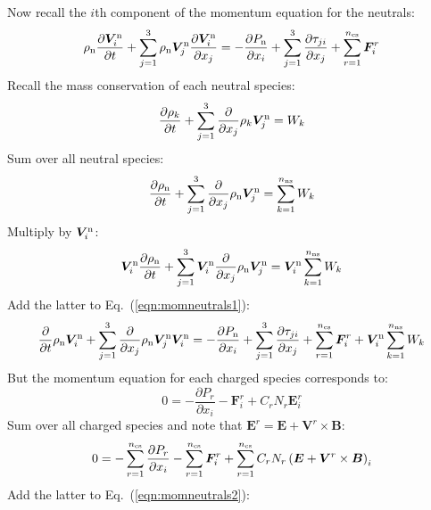 \documentclass{warpdoc}
\newcommand{\nns}{{n_{\rm ns}}}
\newcommand{\ncs}{{n_{\rm cs}}}
\renewcommand{\vec}[1]{\bm{#1}}
\begin{document}
Now recall the $i$th component of the momentum equation for the neutrals:
%
\begin{equation}
  \rho_{\rm n} \frac{\partial \vec{V}_i^{\rm n} }{\partial t}+ \sum_{j=1}^3 \rho_{\rm n} \vec{V}_j^{\rm n} \frac{\partial \vec{V}_i^{\rm n}}{\partial x_j}
=
-\frac{\partial P_{\rm n}}{\partial x_i} 
+ \sum_{j=1}^3 \frac{\partial \tau_{ji}}{\partial x_j}
+ \sum_{r=1}^\ncs \vec{F}_i^r
\label{eqn:momneutrals1}
\end{equation}
%
Recall the mass conservation of each neutral species:
%
\begin{equation}
\frac{\partial \rho_k}{\partial t} + \sum_{j=1}^3 \frac{\partial}{\partial x_j} \rho_k \vec{V}^{\rm n}_j = W_k
\end{equation}
%
Sum over all neutral species:
%
\begin{equation}
\frac{\partial \rho_{\rm n}}{\partial t} + \sum_{j=1}^3 \frac{\partial}{\partial x_j} \rho_{\rm n} \vec{V}^{\rm n}_j = \sum_{k=1}^\nns W_k
\end{equation}
%
Multiply by $\vec{V}_i^{\rm n}$:
%
\begin{equation}
\vec{V}_i^{\rm n} \frac{\partial \rho_{\rm n}}{\partial t} + \sum_{j=1}^3 \vec{V}_i^{\rm n} \frac{\partial}{\partial x_j} \rho_{\rm n} \vec{V}^{\rm n}_j = \vec{V}_i^{\rm n} \sum_{k=1}^\nns  W_k
\end{equation}
%
Add the latter to Eq.\ (\ref{eqn:momneutrals1}):
%
\begin{equation}
   \frac{\partial  }{\partial t}\rho_{\rm n} \vec{V}_i^{\rm n}
  + \sum_{j=1}^3  \frac{\partial }{\partial x_j}\rho_{\rm n} \vec{V}_j^{\rm n} \vec{V}_i^{\rm n}
=
-\frac{\partial P_{\rm n}}{\partial x_i} 
+ \sum_{j=1}^3 \frac{\partial \tau_{ji}}{\partial x_j}
+ \sum_{r=1}^\ncs \vec{F}_i^r
+\vec{V}_i^{\rm n} \sum_{k=1}^\nns  W_k
\label{eqn:momneutrals2}
\end{equation}
%
But the momentum equation for each charged species corresponds to:
%
\begin{equation}
  0 = -\frac{\partial P_r}{\partial x_i} -\vec{F}_i^r + C_r N_r \vec{E}^r_i
\end{equation}
%
Sum over all charged species and note that $\vec{E}^r=\vec{E}+\vec{V}^r \times \vec{B}$:
%
\begin{equation}
  0 = -\sum_{r=1}^\ncs \frac{\partial P_r}{\partial x_i} - \sum_{r=1}^\ncs \vec{F}_i^r + \sum_{r=1}^\ncs C_r N_r \left(\vec{E}+\vec{V}^r \times \vec{B}\right)_i
\end{equation}
%
Add the latter to Eq.\ (\ref{eqn:momneutrals2}):
\end{document}
